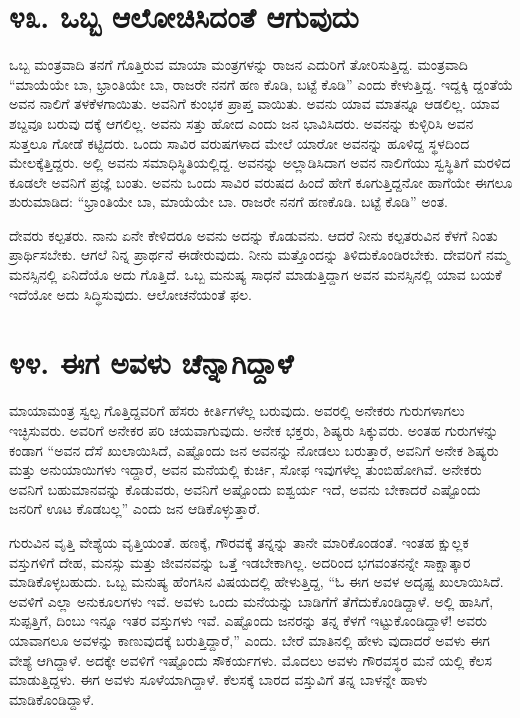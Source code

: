 \section{\num{೪೩. } ಒಬ್ಬ ಆಲೋಚಿಸಿದಂತೆ ಆಗುವುದು}

ಒಬ್ಬ ಮಂತ್ರವಾದಿ ತನಗೆ ಗೊತ್ತಿರುವ ಮಾಯಾ ಮಂತ್ರಗಳನ್ನು ರಾಜನ ಎದುರಿಗೆ ತೋರಿಸುತ್ತಿದ್ದ. ಮಂತ್ರವಾದಿ “ಮಾಯೆಯೇ ಬಾ, ಭ್ರಾಂತಿಯೇ ಬಾ, ರಾಜರೇ ನನಗೆ ಹಣ ಕೊಡಿ, ಬಟ್ಟೆ ಕೊಡಿ” ಎಂದು ಕೇಳುತ್ತಿದ್ದ. ಇದ್ದಕ್ಕಿ ದ್ದಂತೆಯೆ ಅವನ ನಾಲಿಗೆ ತಳಕೆಳಗಾಯಿತು. ಅವನಿಗೆ ಕುಂಭಕ ಪ್ರಾಪ್ತ ವಾಯಿತು. ಅವನು ಯಾವ ಮಾತನ್ನೂ ಆಡಲಿಲ್ಲ. ಯಾವ ಶಬ್ದವೂ ಬರುವು ದಕ್ಕೆ ಆಗಲಿಲ್ಲ. ಅವನು ಸತ್ತು ಹೋದ ಎಂದು ಜನ ಭಾವಿಸಿದರು. ಅವನನ್ನು ಕುಳ್ಳಿರಿಸಿ ಅವನ ಸುತ್ತಲೂ ಗೋಡೆ ಕಟ್ಟಿದರು. ಒಂದು ಸಾವಿರ ವರುಷಗಳಾದ ಮೇಲೆ ಯಾರೋ ಅವನನ್ನು ಹೂಳಿದ್ದ ಸ್ಥಳದಿಂದ ಮೇಲಕ್ಕೆತ್ತಿದ್ದರು. ಅಲ್ಲಿ ಅವನು ಸಮಾಧಿಸ್ಥಿತಿಯಲ್ಲಿದ್ದ. ಅವನನ್ನು ಅಲ್ಲಾಡಿಸಿದಾಗ ಅವನ ನಾಲಿಗೆಯು ಸ್ವಸ್ಥಿತಿಗೆ ಮರಳಿದ ಕೂಡಲೇ ಅವನಿಗೆ ಪ್ರಜ್ಞೆ ಬಂತು. ಅವನು ಒಂದು ಸಾವಿರ ವರುಷದ ಹಿಂದೆ ಹೇಗೆ ಕೂಗುತ್ತಿದ್ದನೋ ಹಾಗೆಯೇ ಈಗಲೂ ಶುರುಮಾಡಿದ: “ಭ್ರಾಂತಿಯೇ ಬಾ, ಮಾಯೆಯೇ ಬಾ. ರಾಜರೇ ನನಗೆ ಹಣಕೊಡಿ. ಬಟ್ಟೆ ಕೊಡಿ” ಅಂತ.

ದೇವರು ಕಲ್ಪತರು. ನಾನು ಏನೇ ಕೇಳಿದರೂ ಅವನು ಅದನ್ನು ಕೊಡುವನು. ಆದರೆ ನೀನು ಕಲ್ಪತರುವಿನ ಕೆಳಗೆ ನಿಂತು ಪ್ರಾರ್ಥಿಸಬೇಕು. ಆಗಲೆ ನಿನ್ನ ಪ್ರಾರ್ಥನೆ ಈಡೇರುವುದು. ನೀನು ಮತ್ತೊಂದನ್ನು ತಿಳಿದುಕೊಂಡಿರಬೇಕು. ದೇವರಿಗೆ ನಮ್ಮ ಮನಸ್ಸಿನಲ್ಲಿ ಏನಿದೆಯೊ ಅದು ಗೊತ್ತಿದೆ. ಒಬ್ಬ ಮನುಷ್ಯ ಸಾಧನೆ ಮಾಡುತ್ತಿದ್ದಾಗ ಅವನ ಮನಸ್ಸಿನಲ್ಲಿ ಯಾವ ಬಯಕೆ ಇದೆಯೋ ಅದು ಸಿದ್ಧಿಸುವುದು. ಆಲೋಚನೆಯಂತೆ ಫಲ.


\section{\num{೪೪. } ಈಗ ಅವಳು ಚೆನ್ನಾಗಿದ್ದಾಳೆ}

ಮಾಯಾಮಂತ್ರ ಸ್ವಲ್ಪ ಗೊತ್ತಿದ್ದವರಿಗೆ ಹೆಸರು ಕೀರ್ತಿಗಳೆಲ್ಲ ಬರುವುದು. ಅವರಲ್ಲಿ ಅನೇಕರು ಗುರುಗಳಾಗಲು ಇಚ್ಛಿಸುವರು. ಅವರಿಗೆ ಅನೇಕರ ಪರಿ ಚಯವಾಗುವುದು. ಅನೇಕ ಭಕ್ತರು, ಶಿಷ್ಯರು ಸಿಕ್ಕುವರು. ಅಂತಹ ಗುರುಗಳನ್ನು ಕಂಡಾಗ “ಅವನ ದೆಸೆ ಖುಲಾಯಿಸಿದೆ, ಎಷ್ಟೊಂದು ಜನ ಅವನನ್ನು ನೋಡಲು ಬರುತ್ತಾರೆ, ಅವನಿಗೆ ಅನೇಕ ಶಿಷ್ಯರು ಮತ್ತು ಅನುಯಾಯಿಗಳು ಇದ್ದಾರೆ, ಅವನ ಮನೆಯಲ್ಲಿ ಕುರ್ಚಿ, ಸೋಫ ಇವುಗಳೆಲ್ಲ ತುಂಬಿಹೋಗಿವೆ. ಅನೇಕರು ಅವನಿಗೆ ಬಹುಮಾನವನ್ನು ಕೊಡುವರು, ಅವನಿಗೆ ಅಷ್ಟೊಂದು ಐಶ್ವರ್ಯ ಇದೆ, ಅವನು ಬೇಕಾದರೆ ಎಷ್ಟೊಂದು ಜನರಿಗೆ ಊಟ ಕೊಡಬಲ್ಲ” ಎಂದು ಜನ ಆಡಿಕೊಳ್ಳುತ್ತಾರೆ.

ಗುರುವಿನ ವೃತ್ತಿ ವೇಶ್ಯೆಯ ವೃತ್ತಿಯಂತೆ. ಹಣಕ್ಕೆ, ಗೌರವಕ್ಕೆ ತನ್ನನ್ನು ತಾನೇ ಮಾರಿಕೊಂಡಂತೆ. ಇಂತಹ ಕ್ಷುಲ್ಲಕ ವಸ್ತುಗಳಿಗೆ ದೇಹ, ಮನಸ್ಸು ಮತ್ತು ಜೀವನವನ್ನು ಒತ್ತೆ ಇಡಬೇಕಾಗಿಲ್ಲ. ಅದರಿಂದ ಭಗವಂತನನ್ನೇ ಸಾಕ್ಷಾತ್ಕಾರ ಮಾಡಿಕೊಳ್ಳಬಹುದು. ಒಬ್ಬ ಮನುಷ್ಯ ಹೆಂಗಸಿನ ವಿಷಯದಲ್ಲಿ ಹೇಳುತ್ತಿದ್ದ, “ಓ ಈಗ ಅವಳ ಅದೃಷ್ಟ ಖುಲಾಯಿಸಿದೆ. ಅವಳಿಗೆ ಎಲ್ಲಾ ಅನುಕೂಲಗಳು ಇವೆ. ಅವಳು ಒಂದು ಮನೆಯನ್ನು ಬಾಡಿಗೆಗೆ ತೆಗೆದುಕೊಂಡಿದ್ದಾಳೆ. ಅಲ್ಲಿ ಹಾಸಿಗೆ, ಸುಪ್ಪತ್ತಿಗೆ, ದಿಂಬು ಇನ್ನೂ ಇತರ ವಸ್ತುಗಳು ಇವೆ. ಎಷ್ಟೊಂದು ಜನರನ್ನು ತನ್ನ ಕೆಳಗೆ ಇಟ್ಟುಕೊಂಡಿದ್ದಾಳೆ! ಅವರು ಯಾವಾಗಲೂ ಅವಳನ್ನು ಕಾಣುವುದಕ್ಕೆ ಬರುತ್ತಿದ್ದಾರೆ,” ಎಂದು. ಬೇರೆ ಮಾತಿನಲ್ಲಿ ಹೇಳು ವುದಾದರೆ ಅವಳು ಈಗ ವೇಶ್ಯೆ ಆಗಿದ್ದಾಳೆ. ಅದಕ್ಕೇ ಅವಳಿಗೆ ಇಷ್ಟೊಂದು ಸೌಕರ್ಯಗಳು. ಮೊದಲು ಅವಳು ಗೌರವಸ್ಥರ ಮನೆ ಯಲ್ಲಿ ಕೆಲಸ ಮಾಡುತ್ತಿದ್ದಳು. ಈಗ ಅವಳು ಸೂಳೆಯಾಗಿದ್ದಾಳೆ. ಕೆಲಸಕ್ಕೆ ಬಾರದ ವಸ್ತುವಿಗೆ ತನ್ನ ಬಾಳನ್ನೇ ಹಾಳು ಮಾಡಿಕೊಂಡಿದ್ದಾಳೆ.


